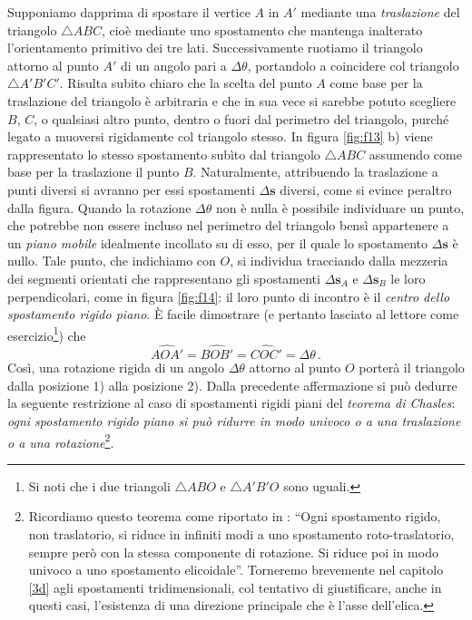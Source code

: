 \noindent Supponiamo dapprima di spostare
il vertice $A$ in $A'$ mediante una {\em traslazione}
del triangolo $\triangle{ABC}$, cio\`e mediante uno spostamento che mantenga inalterato
l'orientamento primitivo dei tre lati.  Successivamente ruotiamo il triangolo
attorno al punto $A'$ di un angolo pari a $\Delta \theta$, portandolo a coincidere
col triangolo $\triangle A'B'C'$.
Risulta subito chiaro che la scelta del punto $A$ come base per 
la traslazione del triangolo \`e arbitraria e che in sua vece si sarebbe potuto scegliere $B$, $C$, o qualsiasi
altro punto, dentro o fuori dal perimetro del triangolo, purch\'e legato a muoversi
rigidamente col triangolo stesso. In figura \ref{fig:f13} b) viene rappresentato lo stesso spostamento sub\`ito
dal triangolo $\triangle ABC$ assumendo come base per la traslazione il punto $B$.
Naturalmente, attribuendo 
la traslazione a punti diversi si avranno per essi spostamenti
$\Delta {\bm s}$ diversi, come si evince peraltro dalla figura.
Quando la rotazione $\Delta \theta$ non \`e nulla
\`e possibile
individuare un punto, che potrebbe
non essere incluso nel perimetro del triangolo bens\`i appartenere a un {\em piano mobile}
idealmente incollato su di esso, per il quale lo spostamento $\Delta {\bm{s}}$ \`e nullo.
Tale punto, che indichiamo con $O$, si individua
tracciando dalla mezzeria dei segmenti orientati che
rappresentano gli spostamenti 
{$\Delta {\bm s}_{\scriptscriptstyle{A}}$} e
{$\Delta {\bm s}_{\scriptscriptstyle{B}}$} le loro perpendicolari,
come in figura \ref{fig:f14}: il loro punto di incontro 
\`e il {\em centro dello spostamento rigido piano}.
\`E facile dimostrare (e pertanto lasciato al lettore come esercizio\footnote{
	Si noti che  i due triangoli $\triangle{ABO}$ e $\triangle{A'B'O}$
sono uguali.}) che 
\begin{equation}
	\widehat{AOA'} = \widehat{BOB'} = \widehat{COC'} =\Delta \theta \,.
	\label{e13}
\end{equation}	
\noindent Cos\`i, una rotazione rigida
di un angolo $\Delta \theta$ attorno al punto $O$
porter\`a il triangolo dalla posizione 1) alla posizione 2).
Dalla precedente affermazione si pu\`o dedurre la seguente restrizione
al caso di spostamenti rigidi piani del {\em teorema di 
Chasles}: {\em ogni spostamento rigido piano
si pu\`o ridurre in modo univoco
o a una traslazione o a una rotazione}\footnote{
\label{chasles}
Ricordiamo questo teorema
come riportato in \cite{finzi}:
``Ogni spostamento rigido, non traslatorio,
si riduce in infiniti modi a uno
spostamento roto-traslatorio, sempre per\`o con la stessa componente di
rotazione. Si riduce poi in modo
univoco a uno spostamento elicoidale''.
Torneremo brevemente nel capitolo \ref{3d}
agli spostamenti tridimensionali, col tentativo
di giustificare, anche in questi casi,
l'esistenza di una direzione principale che \`e l'asse
dell'elica.}.

